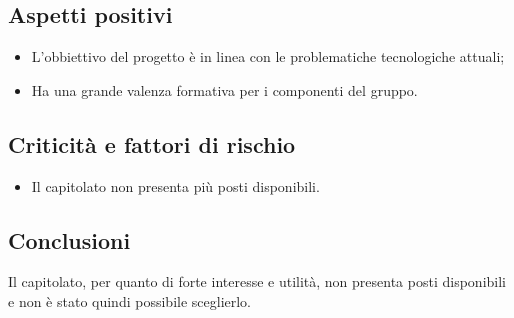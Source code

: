 \subsection{Aspetti positivi}
\begin{itemize}
    \item L'obbiettivo del progetto è in linea con le problematiche tecnologiche attuali;
    \item Ha una grande valenza formativa per i componenti del gruppo.
\end{itemize}
\subsection{Criticità e fattori di rischio}
\begin{itemize}
    \item Il capitolato non presenta più posti disponibili.
\end{itemize}
\subsection{Conclusioni}
Il capitolato, per quanto di forte interesse e utilità, non presenta posti disponibili e non è stato quindi possibile sceglierlo.